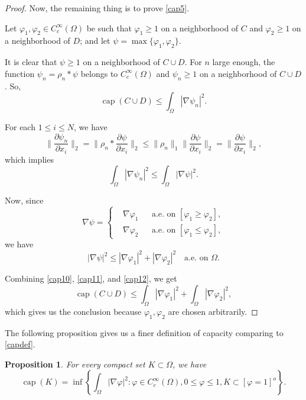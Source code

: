 \documentclass[a4paper, 11pt]{report}
\newtheorem{prn}{Proposition}[chapter]
\theoremstyle{definition}\newtheorem*{rmk}{Remark}
\DeclareMathOperator{\capa}{cap}
\begin{document}
\begin{proof}
Now, the remaining thing is to prove \eqref{cap5}.

Let $\varphi_1,\varphi_2\in C_c^{\infty}(\Omega)$ be such that $\varphi_1 \ge 1$ on a neighborhood of $C$ and $\varphi_2\ge 1$ on a neighborhood of $D$; and let $\psi = \max \{\varphi_1, \varphi_2\}$.

It is clear that $\psi \ge 1$ on a neighborhood of $C \cup D$. For $n$ large enough, the function $\psi_n  = \rho_n * \psi$ belongs to $C_c^{\infty}(\Omega)$ and $\psi_n \ge 1$ on a neighborhood of $C \cup D$. So,
\begin{equation}\label{cap10}
\capa(C\cup D) \le \int_{\Omega}|\nabla \psi_n|^2.
\end{equation}

For each $1 \le i \le N$, we have
\[
\| \frac{\partial \psi_n}{\partial x_i} \|_2=\| \rho_n * \frac{\partial \psi}{\partial x_i} \|_2 \le \| \rho_n \|_1 \|\frac{\partial \psi}{\partial x_i}\|_2 =  \|\frac{\partial \psi}{\partial x_i}\|_2  ,
\]
which implies
\begin{equation}\label{cap11}
\int_{\Omega}|\nabla \psi_n|^2 \le \int_{\Omega}|\nabla \psi|^2 .
\end{equation}

Now, since
\[
\nabla \psi  = \left\{
\begin{aligned}
&\nabla \varphi_1 &&\text{a.e.\ on }[\varphi_1 \ge \varphi_2],\\
&\nabla \varphi_2 &&\text{a.e.\ on }[\varphi_1 \le \varphi_2],
\end{aligned}
\right.
\]
we have
\begin{equation}\label{cap12}
|\nabla \psi |^2 \le |\nabla \varphi_1|^2 + |\nabla \varphi_2|^2\quad\text{a.e.\ on }\Omega.
\end{equation}

Combining \eqref{cap10}, \eqref{cap11}, and \eqref{cap12}, we get
\[
\capa(C\cup D) \le \int_{\Omega}|\nabla \varphi_1|^2 + \int_{\Omega}|\nabla \varphi_2|^2,
\]
which gives us the conclusion because $\varphi_1, \varphi_2$ are chosen arbitrarily.
\end{proof}

The following proposition gives us a finer definition of capacity comparing to \eqref{capdef}.

\begin{prn}\label{31prn}
For every compact set $K\subset \Omega$, we have
\[
\capa (K)= \inf \left\{ \int_{\Omega} |\nabla \varphi |^2: \varphi\in C_c^{\infty}(\Omega), 0\le \varphi\le 1, K \subset [\varphi = 1]^o \right\}.
\]
\end{prn}
\end{document}
